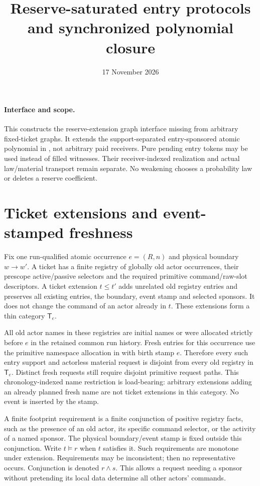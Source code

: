 \documentclass[11pt]{article}
\title{Reserve-saturated entry protocols and synchronized polynomial closure}
\date{17 November 2026}
\begin{document}
\maketitle
\paragraph{Interface and scope.} This constructs the reserve-extension graph interface missing from arbitrary fixed-ticket graphs. It extends the support-separated entry-sponsored atomic polynomial in \texttt{}, not arbitrary paid receivers. Pure pending entry tokens may be used instead of filled witnesses. Their receiver-indexed realization and actual law/material transport remain separate. No weakening chooses a probability law or deletes a reserve coefficient.

\section{Ticket extensions and event-stamped freshness}
Fix one run-qualified atomic occurrence $e=(R,n)$ and physical boundary $w\to w'$. A ticket has a finite registry of globally old actor occurrences, their prescope active/passive selectors and the required primitive command/raw-slot descriptors. A ticket extension $t\leq t'$ adds unrelated old registry entries and preserves all existing entries, the boundary, event stamp and selected sponsors. It does not change the command of an actor already in $t$. These extensions form a thin category $\mathsf T_e$.

All old actor names in these registries are initial names or were allocated strictly before $e$ in the retained common run history. Fresh entries for this occurrence use the primitive namespace allocation in \texttt{} with birth stamp $e$. Therefore every such entry support and actorless material request is disjoint from every old registry in $\mathsf T_e$. Distinct fresh requests still require disjoint primitive request paths. This chronology-indexed name restriction is load-bearing: arbitrary extensions adding an already planned fresh name are not ticket extensions in this category. No event is inserted by the stamp.

A finite footprint requirement is a finite conjunction of positive registry facts, such as the presence of an old actor, its specific command selector, or the activity of a named sponsor. The physical boundary/event stamp is fixed outside this conjunction. Write $t\models r$ when $t$ satisfies it. Such requirements are monotone under extension. Requirements may be inconsistent; then no representative occurs. Conjunction is denoted $r\wedge s$. This allows a request needing a sponsor without pretending its local data determine all other actors' commands.
\end{document}
